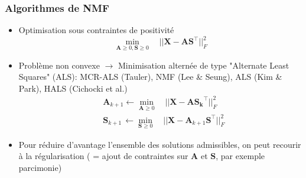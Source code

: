\documentclass[9pt]{beamer}
\newcommand{\Blue}[1]{\textcolor{blue}{#1}}
\newcommand{\Red}[1]{\textcolor{red}{#1}}
\begin{document}
%
%
%
%




\begin{frame}
\frametitle{Algorithmes de NMF}


\begin{itemize}[label=\tiny$\blacksquare$]
	\item Optimisation sous contraintes de positivité
	\[
		\min_{\mathbf{A}\geq 0, \mathbf{S}\geq 0} \quad  |\!|\mathbf{X} - \mathbf{A}\mathbf{S}^\top|\!|_F^2
	\]
	\item Problème non convexe $\rightarrow$ \alert{Minimisation alternée} de type \alert{"Alternate Least Squares" (ALS)}: MCR-ALS (Tauler), NMF (Lee \& Seung), ALS (Kim \& Park), HALS (Cichocki et al.)
	\begin{align*}
		&\mathbf{A}_{k+1} \leftarrow \min_{\mathbf{A}\geq 0} \quad  |\!|\mathbf{X} - \mathbf{A}\mathbf{S_k}^\top|\!|_F^2\\
		&\mathbf{S}_{k+1} \,\leftarrow\min_{\mathbf{S}\geq 0} \quad  |\!|\mathbf{X} - \mathbf{A}_{k+1}\mathbf{S}^\top|\!|_F^2
	\end{align*}
	
	\item Pour réduire d'avantage l'ensemble des solutions admissibles, on peut recourir à la régularisation ( = ajout de contraintes sur $\mathbf{A}$ et $\mathbf{S}$, par exemple parcimonie)
\end{itemize}
\end{frame}
\end{document}
